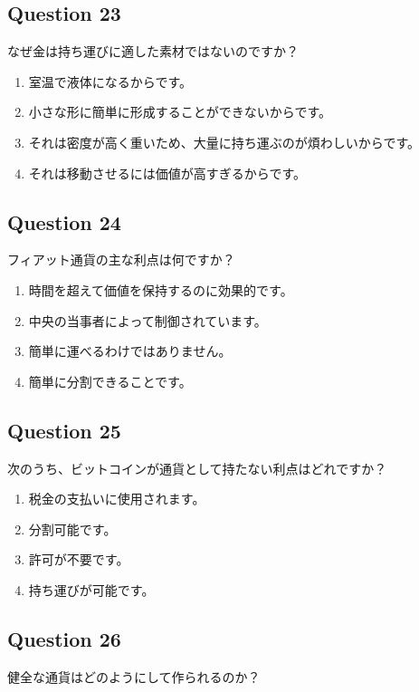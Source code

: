 \documentclass[12pt,a4paper]{article}
\begin{document}
\bigskip


\subsection*{Question 23}
なぜ金は持ち運びに適した素材ではないのですか？

\begin{enumerate}[label=\Alph*., leftmargin=*]
\item 室温で液体になるからです。
\item 小さな形に簡単に形成することができないからです。
\item それは密度が高く重いため、大量に持ち運ぶのが煩わしいからです。
\item それは移動させるには価値が高すぎるからです。
\end{enumerate}

\bigskip


\subsection*{Question 24}
フィアット通貨の主な利点は何ですか？

\begin{enumerate}[label=\Alph*., leftmargin=*]
\item 時間を超えて価値を保持するのに効果的です。
\item 中央の当事者によって制御されています。
\item 簡単に運べるわけではありません。
\item 簡単に分割できることです。
\end{enumerate}

\bigskip


\subsection*{Question 25}
次のうち、ビットコインが通貨として持たない利点はどれですか？

\begin{enumerate}[label=\Alph*., leftmargin=*]
\item 税金の支払いに使用されます。
\item 分割可能です。
\item 許可が不要です。
\item 持ち運びが可能です。
\end{enumerate}

\bigskip


\subsection*{Question 26}
健全な通貨はどのようにして作られるのか？
\end{document}
